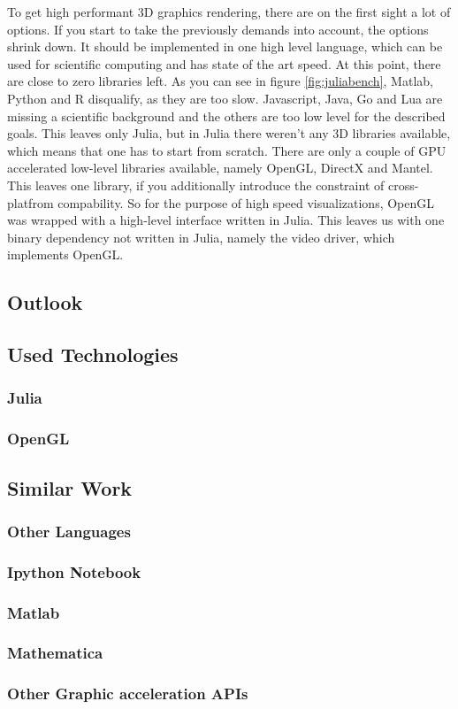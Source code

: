 To get high performant 3D graphics rendering, there are on the first sight a lot of options.
If you start to take the previously demands into account, the options shrink down.
It should be implemented in one high level language, which can be used for scientific computing and has state of the art speed. At this point, there are close to zero libraries left. As you can see in figure \ref{fig:juliabench}, Matlab, Python and R disqualify, as they are too slow. Javascript, Java, Go and Lua are missing a scientific background and the others are too low level for the described goals.
This leaves only Julia, but in Julia there weren't any 3D libraries available, which means that one has to start from scratch.
There are only a couple of GPU accelerated low-level libraries available, namely OpenGL, DirectX and Mantel. This leaves one library, if you additionally introduce the constraint of cross-platfrom compability.
So for the purpose of high speed visualizations, OpenGL was wrapped with a high-level interface written in Julia. This leaves us with one binary dependency not written in Julia, namely the video driver, which implements OpenGL.

\subsection{Outlook}

\subsection{Used Technologies}

\subsubsection{Julia}
\subsubsection{OpenGL}


\subsection{Similar Work}

\subsubsection{Other Languages}
\subsubsection{Ipython Notebook}
\subsubsection{Matlab}
\subsubsection{Mathematica}
\subsubsection{Other Graphic acceleration APIs}
